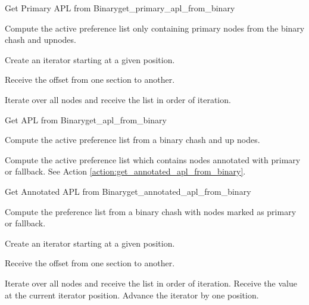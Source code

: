 \begin{actionbox}{Get Primary APL from Binary}{get_primary_apl_from_binary}
	\begin{action}
		 Compute the active preference list only containing primary nodes from the binary chash and upnodes.
		\begin{action}
			 Create an iterator starting at a given position.
			\begin{action}
				 Receive the offset from one section to another.
			\end{action}
			 Iterate over all nodes and receive the list in order of iteration.
		\end{action}
	\end{action}
\end{actionbox}

\begin{actionbox}{Get APL from Binary}{get_apl_from_binary}
	\begin{action}
		 Compute the active preference list from a binary chash and up nodes.
		\begin{action}
			 Compute the active  preference list which contains nodes annotated with primary or fallback.
			See Action \ref{action:get_annotated_apl_from_binary}.
		\end{action}
	\end{action}
\end{actionbox}

\begin{actionbox}{Get Annotated APL from Binary}{get_annotated_apl_from_binary}
	\begin{action}
		 Compute the preference list from a binary chash with nodes marked as primary or fallback.
		\begin{action}
			 Create an iterator starting at a given position.
			\begin{action}
				 Receive the offset from one section to another.
			\end{action}
			 Iterate over all nodes and receive the list in order of iteration.
			 Receive the value at the current iterator position.
			 Advance the iterator by one position.
		\end{action}
	\end{action}
\end{actionbox}

